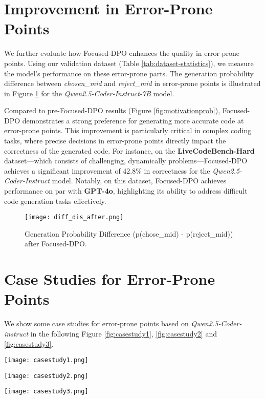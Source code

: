 \section{Improvement in Error-Prone Points}
\label{sec:improveerrorpronepoints}
We further evaluate how Focused-DPO enhances the quality in error-prone points. 
Using our validation dataset (Table \ref{tab:dataset-statistics}), we measure the model's performance on these error-prone parts. 
The generation probability difference between \textit{chosen\_mid} and \textit{reject\_mid} in error-prone points is illustrated in Figure \ref{fig:diffaftertraining} for the \textit{Qwen2.5-Coder-Instruct-7B} model.

Compared to pre-Focused-DPO results (Figure \ref{fig:motivationprob}), Focused-DPO demonstrates a strong preference for generating more accurate code at error-prone points. 
This improvement is particularly critical in complex coding tasks, where precise decisions in error-prone points directly impact the correctness of the generated code. 
For instance, on the \textbf{LiveCodeBench-Hard} dataset—which consists of challenging, dynamically problems—Focused-DPO achieves a significant improvement of 42.8\% in correctness for the \textit{Qwen2.5-Coder-Instruct} model. 
Notably, on this dataset, Focused-DPO achieves performance on par with \textbf{GPT-4o}, highlighting its ability to address difficult code generation tasks effectively.

\begin{figure}[h]
\centering
  \texttt{[image: diff\_dis\_after.png]}  
\caption{Generation Probability Difference (p(chose\_mid) - p(reject\_mid)) after Focused-DPO.}
\label{fig:diffaftertraining}
\end{figure}


\section{Case Studies for Error-Prone Points}

We show some case studies for error-prone points based on \textit{Qwen2.5-Coder-instruct} in the following Figure \ref{fig:casestudy1}, \ref{fig:casestudy2} and \ref{fig:casestudy3}.
\begin{figure*}[h]
\centering
  \texttt{[image: casestudy1.png]}  
\caption{Case Study: convert to valid variable name}
\label{fig:casestudy1}
\end{figure*}
\begin{figure*}[h]
\centering
  \texttt{[image: casestudy2.png]}  
\caption{Case Study: parse version}
\label{fig:casestudy2}
\end{figure*}

\begin{figure*}[h]
\centering
  \texttt{[image: casestudy3.png]}  
\caption{Case Study: max product}
\label{fig:casestudy3}
\end{figure*}